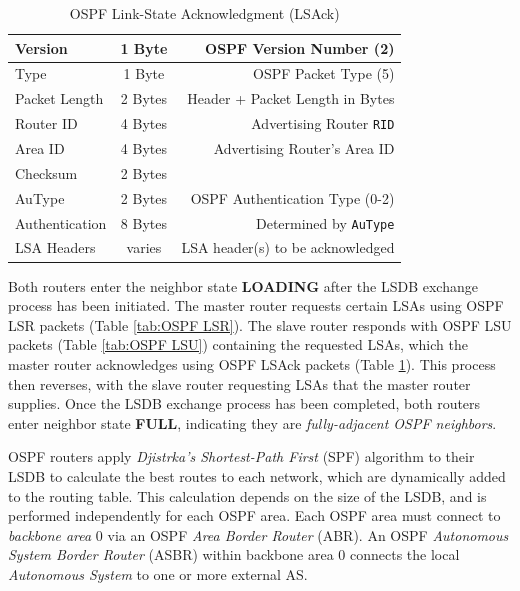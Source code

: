 \documentclass[12pt]{article}
\begin{document}
	\begin{table}[H]
	\centering
	\caption{OSPF Link-State Acknowledgment (LSAck) \label{tab:OSPF LSACK}}
	\begin{tabular}{| l | c | r |}
	\hline
	Version		& 1 Byte	& OSPF Version Number (2)\\\hline
	Type			& 1 Byte	& OSPF Packet Type (5)\\\hline
	Packet Length	& 2 Bytes	& Header + Packet Length in Bytes\\\hline
	Router ID		& 4 Bytes	& Advertising Router \texttt{RID}\\\hline
	Area ID		& 4 Bytes	& Advertising Router's Area ID\\\hline
	Checksum		& 2 Bytes	&\\\hline
	AuType		& 2 Bytes	& OSPF Authentication Type (0-2)\\\hline
	Authentication	& 8 Bytes	& Determined by \texttt{AuType}\\\hline
	LSA Headers	& varies	& LSA header(s) to be acknowledged\\\hline
	\end{tabular}\end{table}
	Both routers enter the neighbor state \textbf{LOADING} after the LSDB exchange process has been initiated. The master router requests certain LSAs using OSPF LSR packets (Table \ref{tab:OSPF LSR}). The slave router responds with OSPF LSU packets (Table \ref{tab:OSPF LSU}) containing the requested LSAs, which the master router acknowledges using OSPF LSAck packets (Table \ref{tab:OSPF LSACK}). This process then reverses, with the slave router requesting LSAs that the master router supplies. Once the LSDB exchange process has been completed, both routers enter neighbor state \textbf{FULL}, indicating they are \textit{fully-adjacent OSPF neighbors}.

	OSPF routers apply \textit{Djistrka's Shortest-Path First} (SPF) algorithm to their LSDB to calculate the best routes to each network, which are dynamically added to the routing table. This calculation depends on the size of the LSDB, and is performed independently for each OSPF area. Each OSPF area must connect to \textit{backbone area} 0 via an OSPF \textit{Area Border Router} (ABR). An OSPF \textit{Autonomous System Border Router} (ASBR) within backbone area 0 connects the local \textit{Autonomous System} to one or more external AS.
\end{document}

